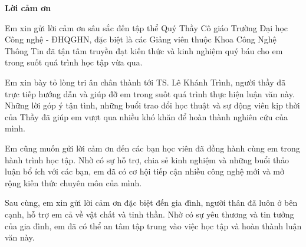 \begin{center}
	\textbf{\large{Lời cảm ơn}}
\end{center}
\indent Em xin gửi lời cảm ơn sâu sắc đến tập thể Quý Thầy Cô giáo Trường Đại học Công nghệ - ĐHQGHN, đặc biệt là các Giảng viên thuộc Khoa Công Nghệ Thông Tin đã tận tâm truyền đạt kiến thức và kinh nghiệm quý báu cho em trong suốt quá trình học tập vừa qua.

\indent Em xin bày tỏ lòng tri ân chân thành tới TS. Lê Khánh Trình, người thầy đã trực tiếp hướng dẫn và giúp đỡ em trong suốt quá trình thực hiện luận văn này. Những lời góp ý tận tình, những buổi trao đổi học thuật và sự động viên kịp thời của Thầy đã giúp em vượt qua nhiều khó khăn để hoàn thành nghiên cứu của mình.

Em cũng muốn gửi lời cảm ơn đến các bạn học viên đã đồng hành cùng em trong hành trình học tập. Nhờ có sự hỗ trợ, chia sẻ kinh nghiệm và những buổi thảo luận bổ ích với các bạn, em đã có cơ hội tiếp cận nhiều công nghệ mới và mở rộng kiến thức chuyên môn của mình.

Sau cùng, em xin gửi lời cảm ơn đặc biệt đến gia đình, người thân đã luôn ở bên cạnh, hỗ trợ em cả về vật chất và tinh thần. Nhờ có sự yêu thương và tin tưởng của gia đình, em đã có thể an tâm tập trung vào việc học tập và hoàn thành luận văn này.
